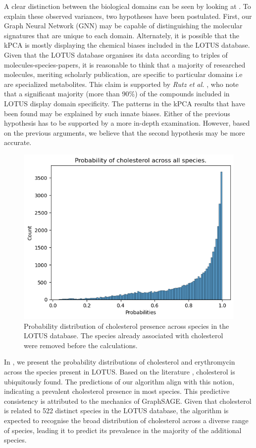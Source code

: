 \documentclass[
11pt, %
oneside, %
english, %
singlespacing, %
headsepline, %
chapterinoneline, %
]{MastersDoctoralThesis} %
\begin{document}
A clear distinction between the biological domains can be seen by looking at . To explain these observed variances, two hypotheses have been postulated. First, our  Graph Neural Network (GNN) may be capable of distinguishing the molecular signatures that are unique to each domain. Alternately, it is possible that the kPCA is mostly displaying the chemical biases included in the LOTUS database. Given that the LOTUS database organises its data according to triples of molecules-species-papers, it is reasonable to think that a majority of  researched molecules, meriting scholarly publication, are specific to particular domains i.e are specialized metabolites. This claim is supported by \textit{Rutz et al.} \cite{rutzLOTUSInitiativeOpen2022}, who note that a significant majority (more than 90\%) of the compounds included in LOTUS display domain specificity. The patterns in the kPCA results that have been found may be explained by such innate biases. Either of the previous hypothesis has to be supported by a more in-depth examination. However, based on the previous arguments, we believe that the second hypothesis may be more accurate.
 
\begin{figure}[h]
	\centering
	\includegraphics[scale=0.7]{figure/cholesterol}
	\caption{Probability distribution of cholesterol presence across species in the LOTUS database. The species already associated with cholesterol were removed before the calculations.}
	\label{fig: hist cholesterol}
\end{figure}

In , we present the probability distributions of cholesterol and erythromycin across the species present in LOTUS. Based on the literature \cite{o2013merck, international1979iarc}, cholesterol is ubiquitously found. The predictions of our algorithm align with this notion, indicating a prevalent cholesterol presence in most species. This predictive consistency is attributed to the mechanics of GraphSAGE. Given that cholesterol is related to 522 distinct species in the LOTUS database, the algorithm is expected to recognise the broad distribution of cholesterol across a diverse range of species, leading it to predict its prevalence in the majority of the additional species.
\end{document}

